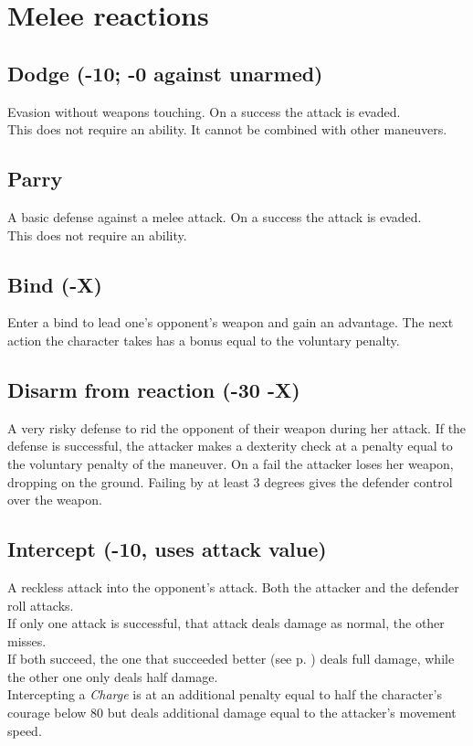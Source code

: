\section{Melee reactions}
\subsection*{Dodge (-10; -0 against unarmed)}
Evasion without weapons touching. On a success the attack is evaded.\\
This does not require an ability. It cannot be combined with other maneuvers.
\subsection*{Parry}
A basic defense against a melee attack. On a success the attack is evaded.\\
This does not require an ability.
\subsection*{Bind (-X)}
Enter a bind to lead one’s opponent’s weapon and gain an advantage. The next action the character takes has a bonus equal to the voluntary penalty.
\subsection*{Disarm from reaction (-30 -X)}
A very risky defense to rid the opponent of their weapon during her attack. If the defense is successful, the attacker makes a dexterity check at a penalty equal to the voluntary penalty of the maneuver. On a fail the attacker loses her weapon, dropping on the ground. Failing by at least 3 degrees gives the defender control over the weapon.
\subsection*{Intercept (-10, uses attack value)}
A reckless attack into the opponent's attack. Both the attacker and the defender roll attacks.\\
If only one attack is successful, that attack deals damage as normal, the other misses.\\
If both succeed, the one that succeeded better (see p. \pageref{sec:opposedchecks}) deals full damage, while the other one only deals half damage.\\
Intercepting a \emph{Charge} is at an additional penalty equal to half the character’s courage below 80 but deals additional damage equal to the attacker’s movement speed.

